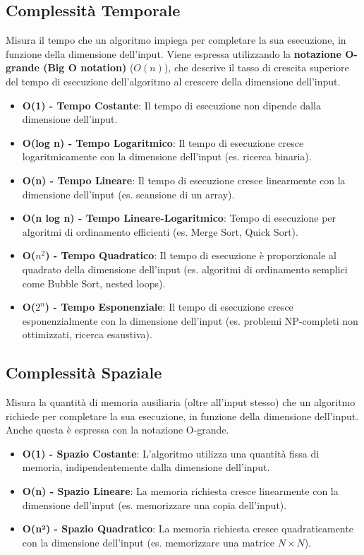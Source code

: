 \subsection{Complessità Temporale}
Misura il tempo che un algoritmo impiega per completare la sua esecuzione, in funzione della dimensione dell'input. Viene espressa utilizzando la \textbf{notazione O-grande (Big O notation)} ($O(n)$), che descrive il tasso di crescita superiore del tempo di esecuzione dell'algoritmo al crescere della dimensione dell'input.
\begin{itemize}
    \item \textbf{O(1) - Tempo Costante}: Il tempo di esecuzione non dipende dalla dimensione dell'input.
    \item \textbf{O(log n) - Tempo Logaritmico}: Il tempo di esecuzione cresce logaritmicamente con la dimensione dell'input (es. ricerca binaria).
    \item \textbf{O(n) - Tempo Lineare}: Il tempo di esecuzione cresce linearmente con la dimensione dell'input (es. scansione di un array).
    \item \textbf{O(n log n) - Tempo Lineare-Logaritmico}: Tempo di esecuzione per algoritmi di ordinamento efficienti (es. Merge Sort, Quick Sort).
    \item \textbf{O($n^2$) - Tempo Quadratico}: Il tempo di esecuzione è proporzionale al quadrato della dimensione dell'input (es. algoritmi di ordinamento semplici come Bubble Sort, nested loops).
    \item \textbf{O($2^n$) - Tempo Esponenziale}: Il tempo di esecuzione cresce esponenzialmente con la dimensione dell'input (es. problemi NP-completi non ottimizzati, ricerca esaustiva).
\end{itemize}

\subsection{Complessità Spaziale}
Misura la quantità di memoria ausiliaria (oltre all'input stesso) che un algoritmo richiede per completare la sua esecuzione, in funzione della dimensione dell'input. Anche questa è espressa con la notazione O-grande.

\begin{itemize}
    \item \textbf{O(1) - Spazio Costante}: L'algoritmo utilizza una quantità fissa di memoria, indipendentemente dalla dimensione dell'input.
    \item \textbf{O(n) - Spazio Lineare}: La memoria richiesta cresce linearmente con la dimensione dell'input (es. memorizzare una copia dell'input).
    \item \textbf{O(n²) - Spazio Quadratico}: La memoria richiesta cresce quadraticamente con la dimensione dell'input (es. memorizzare una matrice $N \times N$).
\end{itemize}